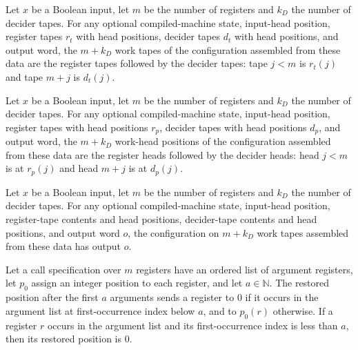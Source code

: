 \begin{lemma}
\label{Complexity.LogProg.mkCfg_workTapes}
\leanok
{}
Let $x$ be a Boolean input, let $m$ be the number of registers and $k_D$ the number of
decider tapes. For any optional compiled-machine state, input-head position, register
tapes $r_t$ with head positions, decider tapes $d_t$ with head positions, and output
word, the $m+k_D$ work tapes of the configuration assembled from these data are the
register tapes followed by the decider tapes: tape $j<m$ is $r_t(j)$ and tape $m+j$ is
$d_t(j)$.
\end{lemma}

\begin{lemma}
\label{Complexity.LogProg.mkCfg_workTapePos}
\leanok
{}
Let $x$ be a Boolean input, let $m$ be the number of registers and $k_D$ the number of
decider tapes. For any optional compiled-machine state, input-head position, register
tapes with head positions $r_p$, decider tapes with head positions $d_p$, and output
word, the $m+k_D$ work-head positions of the configuration assembled from these data are
the register heads followed by the decider heads: head $j<m$ is at $r_p(j)$ and head
$m+j$ is at $d_p(j)$.
\end{lemma}

\begin{lemma}
\label{Complexity.LogProg.mkCfg_output}
\leanok
{}
Let $x$ be a Boolean input, let $m$ be the number of registers and $k_D$ the number of
decider tapes. For any optional compiled-machine state, input-head position,
register-tape contents and head positions, decider-tape contents and head positions, and
output word $o$, the configuration on $m+k_D$ work tapes assembled from these data has
output $o$.
\end{lemma}

\begin{lemma}
\label{Complexity.LogProg.retPos_of_lt}
\leanok
{}
Let a call specification over $m$ registers have an ordered list of argument registers,
let $p_0$ assign an integer position to each register, and let $a\in\mathbb{N}$. The
restored position after the first $a$ arguments sends a register to $0$ if it occurs in
the argument list at first-occurrence index below $a$, and to $p_0(r)$ otherwise. If a
register $r$ occurs in the argument list and its first-occurrence index is less than
$a$, then its restored position is $0$.
\end{lemma}

